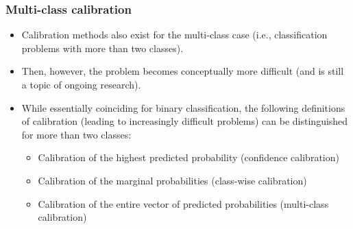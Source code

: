 \documentclass[11pt,compress,t,notes=noshow, xcolor=table]{beamer}
\begin{document}
\begin{frame}[t]
	\frametitle{Multi-class calibration}
	
	\begin{itemize}
		\item Calibration methods also exist for the multi-class case (i.e., classification problems with more than two classes).
		\item Then, however, the problem becomes conceptually more difficult (and is still a topic of ongoing research).
		\item 
		While essentially coinciding for binary classification, the following definitions of calibration (leading to increasingly difficult problems) can be distinguished for more than two classes:
		\begin{itemize}
			\item Calibration of the highest predicted probability (confidence calibration) 
			\item Calibration of the marginal probabilities (class-wise calibration)
			\item Calibration of the entire vector of predicted probabilities (multi-class calibration)
		\end{itemize}
	\end{itemize}
\end{frame}

%
\endlecture
\end{document}
